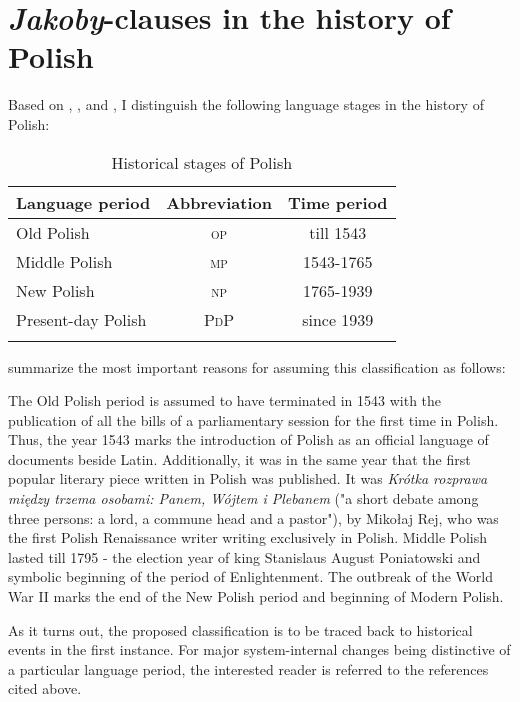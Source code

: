 \documentclass[output=paper
,modfonts
,nonflat]{langsci/langscibook}
\begin{document}
\section{\emph{Jakoby}-clauses in the history of Polish} \label{diachrony} 

Based on \textcite{Klemensiewicz2009}, \textcite{Walczak1999}, and \textcite{Dziubalska-Koaczyk-Walczak2010}, I distinguish the following language stages in the history of Polish: 

\pagebreak

\begin{table}[h] \center
\begin{tabular}{lcc} 
\lsptoprule
Language period & Abbreviation & Time period  \\
\midrule
 Old Polish & \textsc{op} & till 1543 \\
 Middle Polish & \textsc{mp} & 1543-1765  \\
 New Polish & \textsc{np} & 1765-1939 \\
 Present-day Polish & \textsc{PdP} & since 1939 \\ 
\lspbottomrule
\end{tabular}
\caption{Historical stages of Polish}
\end{table}

\noindent \textcite[823]{Dziubalska-Koaczyk-Walczak2010} summarize the most important reasons for assuming this classification as follows:

\begin{displayquote}
The Old Polish period is assumed to have terminated in 1543 with the publication of all the bills of a parliamentary session for the first time in Polish. Thus, the year 1543 marks the introduction of Polish as an official language of documents beside Latin. Additionally, it was in the same year that the first popular literary piece written in Polish was published. It was \emph{Krótka rozprawa między trzema osobami: Panem, Wójtem i Plebanem} ("a short debate among three persons: a lord, a commune head and a pastor"), by Mikołaj Rej, who was the first Polish Renaissance writer writing exclusively in Polish. Middle Polish lasted till 1795 - the election year of king Stanislaus August Poniatowski and symbolic beginning of the period of Enlightenment. The outbreak of the World War II marks the end of the New Polish period and beginning of Modern Polish.
\end{displayquote}

\noindent As it turns out, the proposed classification is to be traced back to historical events in the first instance. For major system-internal changes being distinctive of a particular language period, the interested reader is referred to the references cited above. 
\end{document}
